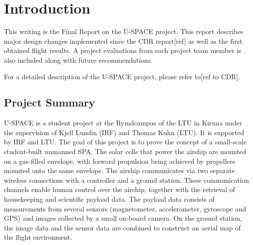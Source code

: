 \newpage
\chapter{Introduction}
\label{chap:introduction}

This writing is the Final Report on the \ac{U-SPACE} project. This report describes major design changes implemented since the \ac{CDR} report[ref] as well as the first obtained flight results. A project evaluations from each project team member is also included along with future recommendations.

For a detailed description of the \ac{U-SPACE} project, please refer to[ref to CDR].

\section{Project Summary}
\ac{U-SPACE} is a student project at the Rymdcampus of the \ac{LTU} in Kiruna under the supervision of Kjell Lundin (\ac{IRF}) and Thomas Kuhn (\ac{LTU}). It is supported by \ac{IRF} and \ac{LTU}. The goal of this project is to prove the concept of a small-scale student-built unmanned \ac{SPA}. The solar cells that power the airship are mounted on a gas-filled envelope, with forward propulsion being achieved by propellers mounted onto the same envelope. The airship communicates via two separate wireless connections with a controller and a ground station. These communication channels enable human control over the airship, together with the retrieval of housekeeping and scientific payload data. The payload data consists of measurements from several sensors (magnetometer, accelerometer, gyroscope and \ac{GPS}) and images collected by a small on-board camera. On the ground station, the image data and the sensor data are combined to construct an aerial map of the flight environment.
\\
\\